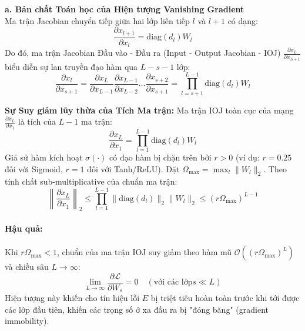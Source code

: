 \documentclass[12pt]{article}
\begin{document}
\textbf{a. Bản chất Toán học của Hiện tượng Vanishing Gradient}\\

Ma trận Jacobian chuyển tiếp giữa hai lớp liên tiếp $l$ và $l+1$ có dạng:
\begin{equation}
    \frac{\partial x_{l+1}}{\partial x_l} = \text{diag}(d_l) W_l
\end{equation}
Do đó, ma trận Jacobian Đầu vào - Đầu ra (Input - Output Jacobian - IOJ) $\frac{\partial x_L}{\partial x_{S+1}}$ biểu diễn sự lan truyền đạo hàm qua $L-s-1$ lớp:
\begin{equation}
    \frac{\partial x_l}{\partial x_{s+1}} = \frac{\partial x_L}{\partial x_{L-1}} \frac{\partial x_{L-1}}{\partial x_{L-2}} \dots \frac{\partial x_{s+2}}{\partial x_{s+1}} = \prod_{l=s+1}^{L-1} \text{diag}(d_l) W_l
\end{equation}

\textbf{Sự Suy giảm lũy thừa của Tích Ma trận:} Ma trận IOJ toàn cục của mạng $\frac{\partial x_L}{\partial x_1}$ là tích của $L-1$ ma trận:
\begin{equation}
    \frac{\partial x_L}{\partial x_1} = \prod_{l=1}^{L-1} \text{diag}(d_l) W_l
\end{equation}
Giả sử hàm kích hoạt $\sigma(\cdot)$ có đạo hàm bị chặn trên bởi $r > 0$ (ví dụ: $r = 0.25$ đối với Sigmoid, $r = 1$ đối với Tanh/ReLU). Đặt $\Omega_{\max} = \max_{l} \|W_l\|_2$. Theo tính chất sub-multiplicative của chuẩn ma trận:
\begin{equation}
\left\| \frac{\partial x_L}{\partial x_1} \right\|_2 \le \prod_{l=1}^{L-1} \|\text{diag}(d_l)\|_2 \|W_l\|_2 \le \left( r \Omega_{\max} \right)^{L-1}
\end{equation}

\paragraph{Hậu quả:} Khi $r \Omega_{\max} <1$, chuẩn của ma trận IOJ suy giảm theo hàm mũ $\mathcal{O}\left((r \Omega_{\max})^L\right)$ và chiều sâu $L \to \infty$:
\begin{equation}
    \lim_{L \to \infty} \frac{\partial \mathcal{L}}{\partial W_s} = 0 \quad(\text{với các lớp} s \ll L)
\end{equation}
Hiện tượng này khiến cho tín hiệu lỗi $E$ bị triệt tiêu hoàn toàn trước khi tới được các lớp đầu tiên, khiến các trọng số ở xa đầu ra bị "đóng băng" (gradient immobility).
\end{document}
